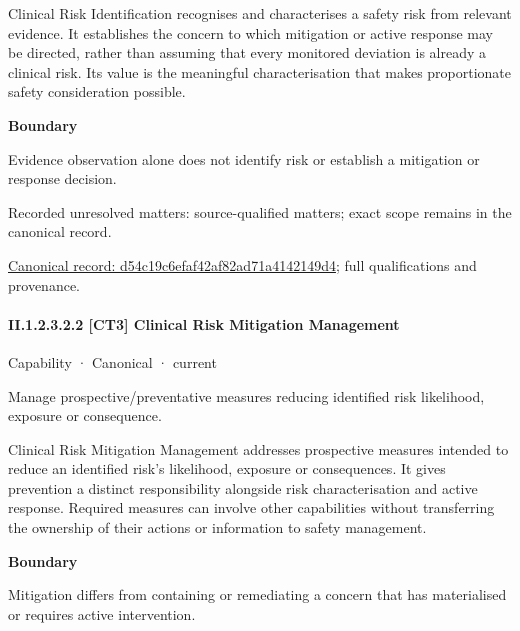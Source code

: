 Clinical Risk Identification recognises and characterises a safety risk from relevant evidence. It establishes the concern to which mitigation or active response may be directed, rather than assuming that every monitored deviation is already a clinical risk. Its value is the meaningful characterisation that makes proportionate safety consideration possible.



\textbf{Boundary}



Evidence observation alone does not identify risk or establish a mitigation or response decision.


{\small Recorded unresolved matters: source-qualified matters; exact scope remains in the canonical record.}\par
{\footnotesize \href{../../../../continuum/strategy/capability/d54c19c6efaf42af82ad71a4142149d4.md}{Canonical record: d54c19c6efaf42af82ad71a4142149d4}; full qualifications and provenance.}\par
\paragraph*{II.1.2.3.2.2 [CT3] Clinical Risk Mitigation Management}
\label{navigation:II.1.2.3.2.2}

\label{element:2c232ade21ec45619c3ee4e928bd97ee}
{\small Capability · Canonical · current}\par

Manage prospective/preventative measures reducing identified risk likelihood, exposure or consequence.



Clinical Risk Mitigation Management addresses prospective measures intended to reduce an identified risk's likelihood, exposure or consequences. It gives prevention a distinct responsibility alongside risk characterisation and active response. Required measures can involve other capabilities without transferring the ownership of their actions or information to safety management.



\textbf{Boundary}



Mitigation differs from containing or remediating a concern that has materialised or requires active intervention.


